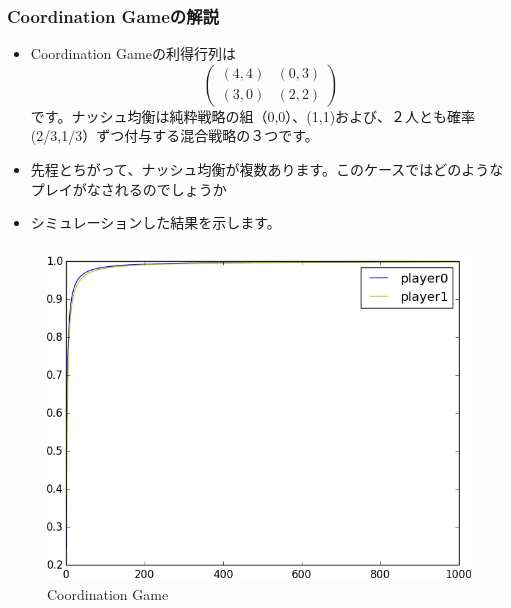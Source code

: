 \documentclass[dvipdfmx,fleqn]{beamer}
\begin{document}
\begin{frame}
\frametitle{Coordination Gameの解説}
\begin{itemize}\setlength{\parskip}{0.5em}
\item
Coordination Gameの利得行列は
\[\left( \begin{array}{cc}
(4,4) & (0,3) \\
(3,0) & (2,2) 
\end{array} \right)\]
です。ナッシュ均衡は純粋戦略の組（0,0）、(1,1)および、２人とも確率(2/3,1/3）ずつ付与する混合戦略の３つです。\pause

\item
先程とちがって、ナッシュ均衡が複数あります。このケースではどのようなプレイがなされるのでしょうか\pause
\item
シミュレーションした結果を示します。



\end{itemize}
\end{frame}

\begin{frame}
\frametitle{}
\begin{figure}
 \centering
 \includegraphics[scale=0.58, bb=-250 -200 250 200]{coordinationgame_graph1.png.png}
 \caption{Coordination Game}
 \label{fig:coordination_plot1}
\end{figure}
\end{frame}
\end{document}
